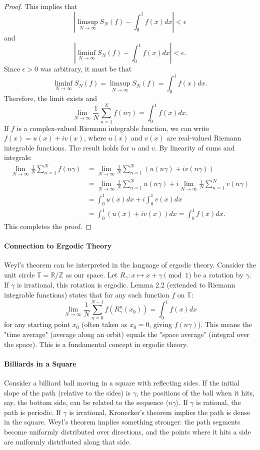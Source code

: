 \documentclass[12pt]{article}
\newcommand{\R}{\mathbb{R}}
\newcommand{\Z}{\mathbb{Z}}
\newcommand{\T}{\mathbb{T}} %
\begin{document}
\begin{proof}
This implies that
$$ \left| \limsup_{N\to\infty} S_N(f) - \int_0^1 f(x) dx \right| < \epsilon $$
and
$$ \left| \liminf_{N\to\infty} S_N(f) - \int_0^1 f(x) dx \right| < \epsilon. $$
Since $\epsilon > 0$ was arbitrary, it must be that
$$ \liminf_{N\to\infty} S_N(f) = \limsup_{N\to\infty} S_N(f) = \int_0^1 f(x) dx. $$
Therefore, the limit exists and
$$ \lim_{N\to\infty} \frac{1}{N} \sum_{n=1}^N f(n\gamma) = \int_0^1 f(x) dx. $$
If $f$ is a complex-valued Riemann integrable function, we can write $f(x) = u(x) + i v(x)$, where $u(x)$ and $v(x)$ are real-valued Riemann integrable functions. The result holds for $u$ and $v$. By linearity of sums and integrals:
\begin{align*} \lim_{N\to\infty} \frac{1}{N} \sum_{n=1}^N f(n\gamma) &= \lim_{N\to\infty} \frac{1}{N} \sum_{n=1}^N (u(n\gamma) + i v(n\gamma)) \\ &= \lim_{N\to\infty} \frac{1}{N} \sum_{n=1}^N u(n\gamma) + i \lim_{N\to\infty} \frac{1}{N} \sum_{n=1}^N v(n\gamma) \\ &= \int_0^1 u(x) dx + i \int_0^1 v(x) dx \\ &= \int_0^1 (u(x) + i v(x)) dx = \int_0^1 f(x) dx. \end{align*}
This completes the proof.
\end{proof}

\paragraph{Connection to Ergodic Theory}
Weyl's theorem can be interpreted in the language of ergodic theory. Consider the unit circle $\T = \R/\Z$ as our space. Let $R_\gamma: x \mapsto x+\gamma \pmod 1$ be a rotation by $\gamma$.
If $\gamma$ is irrational, this rotation is ergodic. Lemma 2.2 (extended to Riemann integrable functions) states that for any such function $f$ on $\T$:
$$ \lim_{N\to\infty} \frac{1}{N} \sum_{n=0}^{N-1} f(R_\gamma^n(x_0)) = \int_0^1 f(x) dx $$
for any starting point $x_0$ (often taken as $x_0=0$, giving $f(n\gamma)$). This means the "time average" (average along an orbit) equals the "space average" (integral over the space). This is a fundamental concept in ergodic theory.

\paragraph{Billiards in a Square}
Consider a billiard ball moving in a square with reflecting sides. If the initial slope of the path (relative to the sides) is $\gamma$, the positions of the ball when it hits, say, the bottom side, can be related to the sequence $\langle n\gamma \rangle$.
If $\gamma$ is rational, the path is periodic.
If $\gamma$ is irrational, Kronecker's theorem implies the path is dense in the square. Weyl's theorem implies something stronger: the path segments become uniformly distributed over directions, and the points where it hits a side are uniformly distributed along that side.
\end{document}
